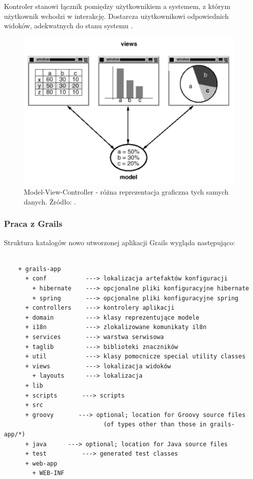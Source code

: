     Kontroler stanowi łącznik pomiędzy użytkownikiem a systemem, z którym użytkownik wchodzi w interakcję. Dostarcza użytkownikowi odpowiednich widoków, adekwatnych do stanu systemu \cite{Trygve79}.

    \begin{figure}[t]
      \centering
      \includegraphics[width=1.0\textwidth]{img/mvc-1.pdf}
      \caption{Model-View-Controller - różna reprezentacja graficzna tych samych danych. Żródło: \cite{GoF}.}
      \label{fig:mvc-1}
    \end{figure}

    \subsubsection{Praca z Grails}

    Struktura katalogów nowo utworzonej aplikacji Grails wygląda następująco:

    \begin{verbatim}

    + grails-app
      + conf           ---> lokalizacja artefaktów konfiguracji
        + hibernate    ---> opcjonalne pliki konfiguracyjne hibernate
        + spring       ---> opcjonalne pliki konfiguracyjne spring 
      + controllers    ---> kontrolery aplikacji
      + domain         ---> klasy reprezentujące modele
      + i18n           ---> zlokalizowane komunikaty il8n
      + services       ---> warstwa serwisowa
      + taglib         ---> biblioteki znaczników
      + util           ---> klasy pomocnicze special utility classes 
      + views          ---> lokalizacja widoków
        + layouts      ---> lokalizacja 
      + lib
      + scripts       ---> scripts
      + src
      + groovy       ---> optional; location for Groovy source files
                            (of types other than those in grails-app/*)
      + java      ---> optional; location for Java source files
      + test          ---> generated test classes
      + web-app
        + WEB-INF

    \end{verbatim}

